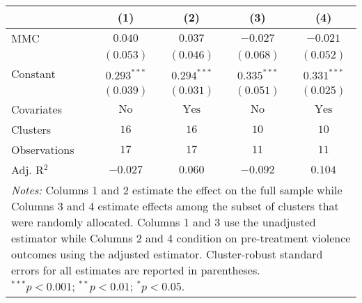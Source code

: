 
\begin{tabular}{l c c c c}
\toprule
 & (1) & (2) & (3) & (4) \\
\midrule
MMC          & $0.040$       & $0.037$        & $-0.027$      & $-0.021$       \\
             & $(0.053)$     & $(0.046)$      & $(0.068)$     & $(0.052)$      \\
Constant     & $0.293^{***}$ & $0.294^{***}$  & $0.335^{***}$ & $0.331^{***}$  \\
             & $(0.039)$     & $(0.031)$      & $(0.051)$     & $(0.025)$      \\
\midrule
Covariates   & $\textrm{No}$ & $\textrm{Yes}$ & $\textrm{No}$ & $\textrm{Yes}$ \\
Clusters     & $16$          & $16$           & $10$          & $10$           \\
Observations & $17$          & $17$           & $11$          & $11$           \\
Adj. R$^2$   & $-0.027$      & $0.060$        & $-0.092$      & $0.104$        \\
\bottomrule
\multicolumn{5}{l}{\scriptsize{\parbox{.5\linewidth}{\vspace{2pt} 
       \textit{Notes:} Columns 1 and 2 estimate the effect on the full sample while Columns 3 
       and 4 estimate effects among the subset of clusters that were randomly allocated.
       Columns 1 and 3 use the unadjusted estimator while Columns 2 and 4 condition on 
       pre-treatment violence outcomes using the adjusted estimator. Cluster-robust 
       standard errors for all estimates are reported in parentheses. \\ $^{***}p<0.001$; $^{**}p<0.01$; $^{*}p<0.05$.}}}
\end{tabular}
